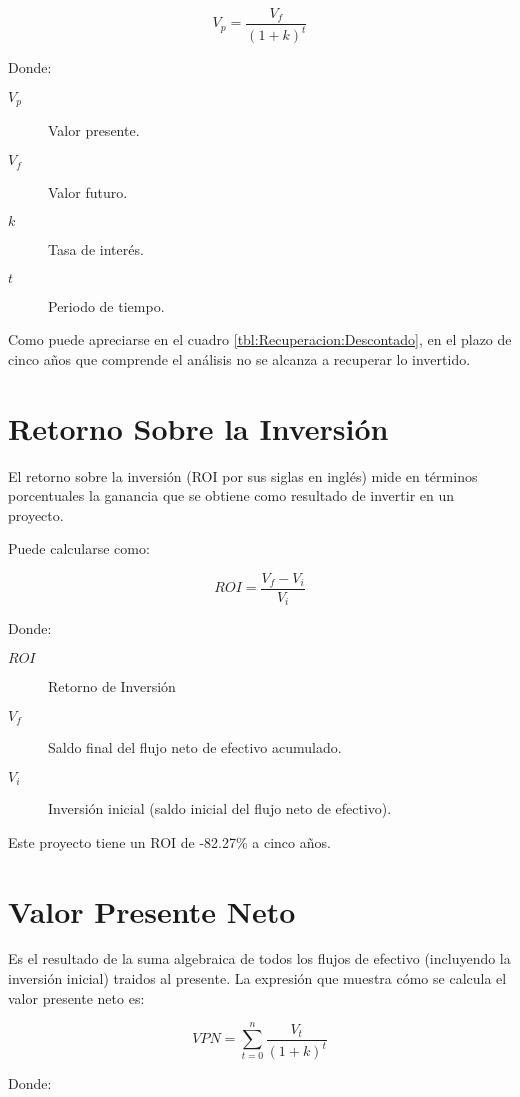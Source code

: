 $$V_p = \frac{V_f}{\left(1+k\right)^t}$$

Donde:

\begin{description}
	\item[$V_p$] Valor presente.
	\item[$V_f$] Valor futuro.
	\item[$k$] Tasa de interés.
	\item[$t$] Periodo de tiempo.
\end{description}

Como puede apreciarse en el cuadro \ref{tbl:Recuperacion:Descontado}, en el plazo de cinco años que comprende el análisis no se alcanza a recuperar lo invertido.



\section{Retorno Sobre la Inversión}

El retorno sobre la inversión (ROI por sus siglas en inglés) mide en términos porcentuales la ganancia que se obtiene como resultado de invertir en un proyecto.

Puede calcularse como:

$$ROI = \frac{V_f - V_i}{V_i}$$

Donde:

\begin{description}
	\item[$ROI$] Retorno de Inversión
	\item[$V_f$] Saldo final del flujo neto de efectivo acumulado.
	\item[$V_i$] Inversión inicial (saldo inicial del flujo neto de efectivo).
\end{description}

Este proyecto tiene un ROI de -82.27\% a cinco años.

\section{Valor Presente Neto}

Es el resultado de la suma algebraica de todos los flujos de efectivo (incluyendo la inversión inicial) traidos al presente. La expresión que muestra cómo se calcula el valor presente neto es:

$$VPN = \sum_{t=0}^{n}{\frac{V_t}{\left(1+k\right)^t}}$$

Donde:

